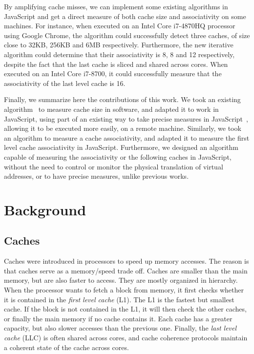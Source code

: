 \documentclass[a4paper,11pt,oneside]{report}
\begin{document}

By amplifying cache misses, we can implement some existing algorithms in JavaScript and get a direct measure of both cache size and associativity on some machines. For instance, when executed on an Intel Core i7-4870HQ processor using Google Chrome, the algorithm could successfully detect three caches, of size close to 32KB, 256KB and 6MB respectively. Furthermore, the new iterative algorithm could determine that their associativity is 8, 8 and 12 respectively, despite the fact that the last cache is sliced and shared across cores. When executed on an Intel Core i7-8700, it could successfully measure that the associativity of the last level cache is 16.


Finally, we summarize here the contributions of this work. We took an existing algorithm~\cite{abel} to measure cache size in software, and adapted it to work in JavaScript, using part of an existing way to take precise measures in JavaScript~\cite{aleph_spectre}, allowing it to be executed more easily, on a remote machine. Similarly, we took an algorithm to measure a cache associativity, and adapted it to measure the first level cache associativity in JavaScript. Furthermore, we designed an algorithm capable of measuring the associativity or the following caches in JavaScript, without the need to control or monitor the physical translation of virtual addresses, or to have precise measures, unlike previous works.

\chapter{Background}



\section{Caches}

Caches were introduced in processors to speed up memory accesses. The reason is that caches serve as a memory/speed trade off. Caches are smaller than the main memory, but are also faster to access. They are mostly organized in hierarchy. When the processor wants to fetch a block from memory, it first checks whether it is contained in the \emph{first level cache} (L1). The L1 is the fastest but smallest cache. If the block is not contained in the L1, it will then check the other caches, or finally the main memory if no cache contains it. Each cache has a greater capacity, but also slower accesses than the previous one. Finally, the \emph{last level cache} (LLC) is often shared across cores, and cache coherence protocols maintain a coherent state of the cache across cores.
\end{document}
